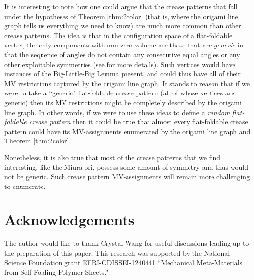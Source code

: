 \documentclass{amsart}
\theoremstyle{definition}
\begin{document}
It is interesting to note how one could argue that the crease patterns that fall under the hypotheses of Theorem \ref{thm:2color} (that is, where the origami line graph tells us everything we need to know) are much more common than other crease patterns.  The idea is that in the configuration space of a flat-foldable vertex, the only components with non-zero volume are those that are {\em generic} in that the sequence of angles do not contain any consecutive equal angles or any other exploitable symmetries (see \cite{Hull4} for more details).  Such vertices would have instances of the Big-Little-Big Lemma present, and could thus have all of their MV restrictions captured by the origami line graph.  It stands to reason that if we were to take a ``generic" flat-foldable crease pattern (all of whose vertices are generic) then its MV restrictions might be completely described by the origami line graph.  In other words, if we were to use these ideas to define a {\em random flat-foldable crease pattern} then it could be true that almost every flat-foldable crease pattern could have its MV-assignments enumerated by the origami line graph and Theorem \ref{thm:2color}.  

Nonetheless, it is also true that most of the crease patterns that we find interesting, like the Miura-ori, possess some amount of symmetry and thus would not be generic.  Such crease pattern MV-assignments will remain more challenging to enumerate.

\section{Acknowledgements}

The author would like to thank Crystal Wang for useful discussions leading up to the preparation of this paper.  This research was supported by the National Science Foundation grant EFRI-ODISSEI-1240441 ``Mechanical Meta-Materials from Self-Folding Polymer Sheets."



\end{document}
